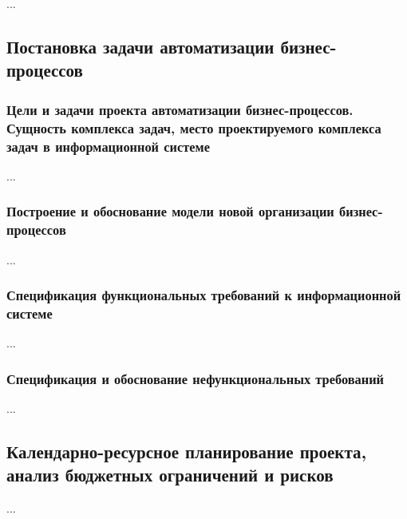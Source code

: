 \documentclass[../thesis.tex]{subfiles}
\begin{document}
...



\subsection{Постановка задачи автоматизации бизнес-процессов}
\subsubsection{Цели и задачи проекта автоматизации бизнес-процессов. Сущность комплекса задач, место проектируемого комплекса задач в информационной системе}

...

\subsubsection{Построение и обоснование модели новой организации бизнес-процессов}

...

\subsubsection{Спецификация функциональных требований к информационной системе}

...

\subsubsection{Спецификация и обоснование нефункциональных требований}

...



\subsection{Календарно-ресурсное планирование проекта, анализ бюджетных ограничений и рисков}

...
\end{document}
